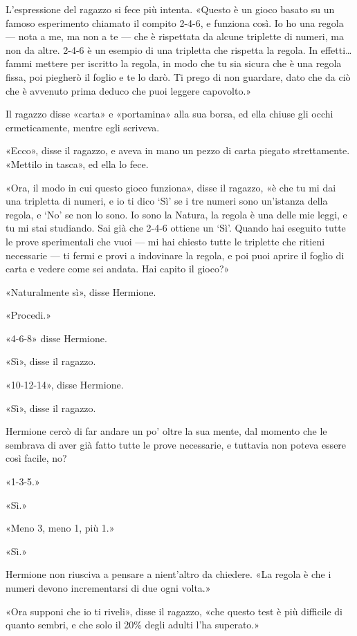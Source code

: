 L’espressione del ragazzo si fece più intenta. «Questo è un gioco basato su un famoso esperimento chiamato il compito 2-4-6, e funziona così. Io ho una regola — nota a me, ma non a te — che è rispettata da alcune triplette di numeri, ma non da altre. 2-4-6 è un esempio di una tripletta che rispetta la regola. In effetti… fammi mettere per iscritto la regola, in modo che tu sia sicura che è una regola fissa, poi piegherò il foglio e te lo darò. Ti prego di non guardare, dato che da ciò che è avvenuto prima deduco che puoi leggere capovolto.»

Il ragazzo disse «carta» e «portamina» alla sua borsa, ed ella chiuse gli occhi ermeticamente, mentre egli scriveva.

«Ecco», disse il ragazzo, e aveva in mano un pezzo di carta piegato strettamente. «Mettilo in tasca», ed ella lo fece.

«Ora, il modo in cui questo gioco funziona», disse il ragazzo, «è che tu mi dai una tripletta di numeri, e io ti dico ‘Sì’ se i tre numeri sono un’istanza della regola, e ‘No’ se non lo sono. Io sono la Natura, la regola è una delle mie leggi, e tu mi stai studiando. Sai già che 2-4-6 ottiene un ‘Sì’. Quando hai eseguito tutte le prove sperimentali che vuoi — mi hai chiesto tutte le triplette che ritieni necessarie — ti fermi e provi a indovinare la regola, e poi puoi aprire il foglio di carta e vedere come sei andata. Hai capito il gioco?»

«Naturalmente sì», disse Hermione.

«Procedi.»

«4-6-8» disse Hermione.

«Sì», disse il ragazzo.

«10-12-14», disse Hermione.

«Sì», disse il ragazzo.

Hermione cercò di far andare un po’ oltre la sua mente, dal momento che le sembrava di aver già fatto tutte le prove necessarie, e tuttavia non poteva essere così facile, no?

«1-3-5.»

«Sì.»

«Meno 3, meno 1, più 1.»

«Sì.»

Hermione non riusciva a pensare a nient’altro da chiedere. «La regola è che i numeri devono incrementarsi di due ogni volta.»

«Ora supponi che io ti riveli», disse il ragazzo, «che questo test è più difficile di quanto sembri, e che solo il 20\% degli adulti l’ha superato.»

